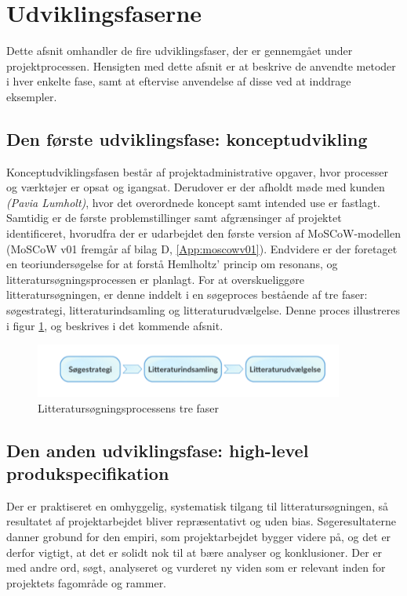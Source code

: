 \vspace{0.5cm}

\section{Udviklingsfaserne}
Dette afsnit omhandler de fire udviklingsfaser, der er gennemgået under projektprocessen. Hensigten med dette afsnit er at beskrive de anvendte metoder i hver enkelte fase, samt at eftervise anvendelse af disse ved at inddrage eksempler.   
  
\subsection{Den første udviklingsfase: konceptudvikling}

Konceptudviklingsfasen består af projektadministrative opgaver, hvor processer og værktøjer er opsat og igangsat. Derudover er der afholdt møde med kunden \textit{(Pavia Lumholt)}, hvor det overordnede koncept samt intended use er fastlagt. Samtidig er de første problemstillinger samt afgrænsinger af projektet identificeret, hvorudfra der er udarbejdet den første version af MoSCoW-modellen (MoSCoW v01 fremgår af bilag D, \ref{App:moscowv01}). Endvidere er der foretaget en teoriundersøgelse for at forstå Hemlholtz' princip om resonans, og litteratursøgningsprocessen er planlagt. For at overskueliggøre litteratursøgningen, er denne inddelt i en søgeproces bestående af tre faser: søgestrategi, litteraturindsamling og litteraturudvælgelse. Denne proces illustreres i figur \ref{fig:littpro}, og beskrives i det kommende afsnit. 

	\begin{figure}[htb]
			\centering
				\includegraphics[width=4in]{Littproces.png}
				\caption{Litteratursøgningsprocessens tre faser}	
				\label{fig:littpro}
	\end{figure}  
	
\subsection{Den anden udviklingsfase: high-level produkspecifikation}
Der er praktiseret en omhyggelig, systematisk tilgang til litteratursøgningen, så resultatet af projektarbejdet bliver repræsentativt og uden bias. Søgeresultaterne danner grobund for den empiri, som projektarbejdet bygger videre på, og det er derfor vigtigt, at det er solidt nok til at bære analyser og konklusioner. Der er med andre ord, søgt, analyseret og vurderet ny viden som er relevant inden for projektets fagområde og rammer.  

